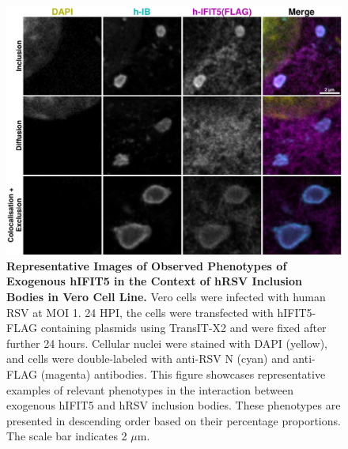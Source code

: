 \begin{figure}
    \centering
    \includegraphics[width=1\linewidth]{09. Chapter 4/Figs/02. Overexpression/04. IFIT5/03. i5-hrsv.pdf}
    \caption[Representative Images of Observed Phenotypes of Exogenous hIFIT5 in the Context of hRSV Inclusion Bodies in Vero Cell Line.]{\textbf{Representative Images of Observed Phenotypes of Exogenous hIFIT5 in the Context of hRSV Inclusion Bodies in Vero Cell Line.} Vero cells were infected with human RSV at MOI 1. 24 HPI, the cells were transfected with hIFIT5-FLAG containing plasmids using TransIT-X2 and were fixed after further 24 hours. Cellular nuclei were stained with DAPI (yellow), and cells were double-labeled with anti-RSV N (cyan) and anti-FLAG (magenta) antibodies. This figure showcases representative examples of relevant phenotypes in the interaction between exogenous hIFIT5 and hRSV inclusion bodies. These phenotypes are presented in descending order based on their percentage proportions. The scale bar indicates 2 \(\mu \mbox{m}\).}
    \label{fig:Representative Images of Observed Phenotypes of Exogenous hIFIT5 in the Context of hRSV Inclusion Bodies in VERO Cell Line}
\end{figure}

